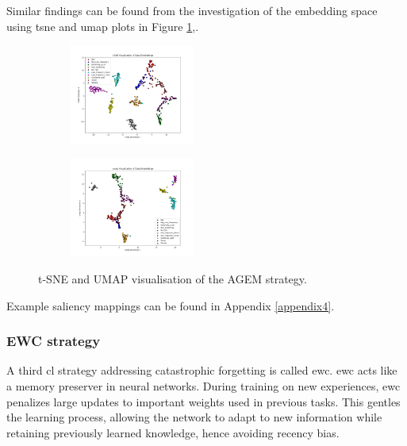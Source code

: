 Similar findings can be found from the investigation of the embedding space using \acrshort{tsne} and \acrshort{umap} plots in Figure \ref{fig:tsne_umap_AGEM},.

\begin{figure}[ht]
\centering
\begin{subfigure}
    \centering
    \includegraphics[width=0.45\textwidth]{Images/tSNE_AGEM_MultiView_testset_100epochs.png}
\end{subfigure}
\begin{subfigure}
    \centering
    \includegraphics[width=0.45\textwidth]{Images/umap_MultiView_AGEM_testset_100epochs.png}
\end{subfigure}
    \caption{t-SNE and UMAP visualisation of the AGEM strategy.}
    \label{fig:tsne_umap_AGEM}
\end{figure}
Example saliency mappings can be found in Appendix \ref{appendix4}.  
\newpage

\subsubsection{EWC strategy}
\label{subsubsec:RQ1_EWC}
A third \acrshort{cl} strategy addressing catastrophic forgetting is called \acrfull{ewc}. \acrshort{ewc} acts like a memory preserver in neural networks. During training on new experiences, \acrshort{ewc} penalizes large updates to important weights used in previous tasks. This gentles the learning process, allowing the network to adapt to new information while retaining previously learned knowledge, hence avoiding recency bias. \\


